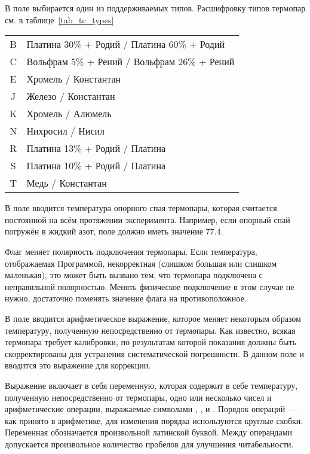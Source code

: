 В поле  выбирается один из поддерживаемых типов. Расшифровку типов термопар см. в таблице~\ref{tab_tc_types}

\begin{table*}
\begin{center}
\caption{Типы термопар}
\begin{tabular}{cl}
\hline \hline
B & Платина 30\% + Родий / Платина 60\% + Родий \\
C & Вольфрам 5\% + Рений / Вольфрам 26\% + Рений \\
E & Хромель / Константан \\
J & Железо / Константан \\
K & Хромель / Алюмель \\
N & Нихросил / Нисил \\
R & Платина 13\% + Родий / Платина \\
S & Платина 10\% + Родий / Платина \\
T & Медь / Константан \\
\hline \hline
\end{tabular}
\label{tab_tc_types}
\end{center}
\end{table*}

В поле  вводится температура опорного спая термопары, которая считается постоянной на всём протяжении эксперимента. Например, если опорный спай погружён в жидкий азот, поле должно иметь значение $77.4$.

Флаг  меняет полярность подключения термопары. Если температура, отображаемая Программой, некорректная (слишком большая или слишком маленькая), это может быть вызвано тем, что термопара подключена с неправильной полярностью. Менять физическое подключение в этом случае не нужно, достаточно поменять значение флага на противоположное.

В поле  вводится арифметическое выражение, которое меняет некоторым образом температуру, полученную непосредственно от термопары. Как известно, всякая термопара требует калибровки, по результатам которой показания должны быть скорректированы для устранения систематической погрешности. В данном поле и вводится это выражение для коррекции.

Выражение включает в себя переменную, которая содержит в себе температуру, полученную непосредственно от термопары, одно или несколько чисел и арифметические операции, выражаемые символами \CMD{+}, \CMD{-}, \CMD{*} и \CMD{/}. Порядок операций~--- как принято в арифметике, для изменения порядка используются круглые скобки. Переменная обозначается произвольной латинской буквой. Между операндами допускается произвольное количество пробелов для улучшения читабельности.

